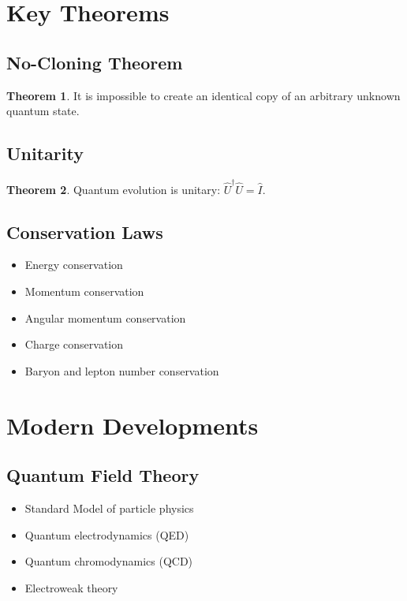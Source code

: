 \documentclass[11pt]{article}
\theoremstyle{definition}
\newtheorem{theorem}{Theorem}[section]
\begin{document}
\section{Key Theorems}

\subsection{No-Cloning Theorem}
\begin{theorem}
It is impossible to create an identical copy of an arbitrary unknown quantum state.
\end{theorem}

\subsection{Unitarity}
\begin{theorem}
Quantum evolution is unitary: $\hat{U}^\dagger\hat{U} = \hat{I}$.
\end{theorem}

\subsection{Conservation Laws}
\begin{itemize}
    \item Energy conservation
    \item Momentum conservation
    \item Angular momentum conservation
    \item Charge conservation
    \item Baryon and lepton number conservation
\end{itemize}

\section{Modern Developments}

\subsection{Quantum Field Theory}
\begin{itemize}
    \item Standard Model of particle physics
    \item Quantum electrodynamics (QED)
    \item Quantum chromodynamics (QCD)
    \item Electroweak theory
\end{itemize}
\end{document}
